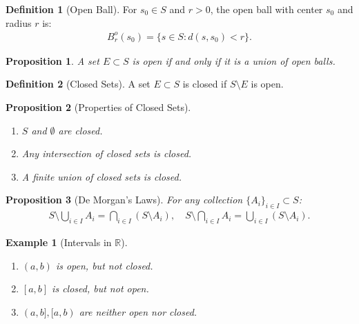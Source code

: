 \documentclass[7pt]{article}
\theoremstyle{definition}
\newtheorem{definition}{Definition}
\theoremstyle{plain}
\newtheorem{proposition}{Proposition}
\newtheorem{example}{Example}
\begin{document}
\begin{definition}[Open Ball]
For $ s_0 \in S $ and $ r > 0 $, the open ball with center $ s_0 $ and radius $ r $ is:
\begin{align}
B_r^o(s_0) = \{s \in S : d(s, s_0) < r\}.
\end{align}
\end{definition}

\begin{proposition}
A set $ E \subset S $ is open if and only if it is a union of open balls.
\end{proposition}

\begin{definition}[Closed Sets]
A set $ E \subset S $ is closed if $ S \setminus E $ is open.
\end{definition}

\begin{proposition}[Properties of Closed Sets]

\begin{enumerate}
    \item $ S $ and $ \emptyset $ are closed.
    \item Any intersection of closed sets is closed.
    \item A finite union of closed sets is closed.
\end{enumerate}
\end{proposition}

\begin{proposition}[De Morgan's Laws]
For any collection $ \{A_i\}_{i \in I} \subset S $:
\begin{align}
S \setminus \bigcup_{i \in I} A_i = \bigcap_{i \in I} (S \setminus A_i), \quad S \setminus \bigcap_{i \in I} A_i = \bigcup_{i \in I} (S \setminus A_i).
\end{align}
\end{proposition}

\begin{example}[Intervals in $ \mathbb{R} $]

\begin{enumerate}
    \item $ (a, b) $ is open, but not closed.
    \item $ [a, b] $ is closed, but not open.
    \item $ (a, b], [a, b) $ are neither open nor closed.
\end{enumerate}
\end{example}
\end{document}
